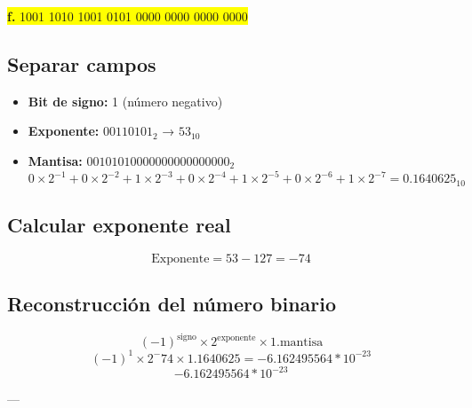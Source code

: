 \documentclass[a4paper,12pt]{article}
\begin{document}
	\newpage
	\begin{center}
		\colorbox{yellow}{\textbf{f.} 1001 1010 1001 0101 0000 0000 0000 0000}
		
		\subsection*{Separar campos}
		
		\begin{itemize}
			\item \textbf{Bit de signo:} 1 (número negativo)
			\item \textbf{Exponente:} $00110101_2$ → $53_{10}$
			\item \textbf{Mantisa:} $00101010000000000000000_2$ 
			\[
			0\times2^{-1} + 0\times2^{-2} + 1\times2^{-3} + 0\times2^{-4} + 1\times2^{-5} + 0\times2^{-6} + 1\times2^{-7} = 0.1640625_{10}
			\]
		\end{itemize}
		
		\subsection*{Calcular exponente real}
		
		\[
		\text{Exponente} = 53 - 127 = -74
		\]
		
		
		
		\subsection*{Reconstrucción del número binario}	
		\[
		(-1)^{\text{signo}} \times 2^{\text{exponente}} \times 1.\text{mantisa}
		\]
		\[
		(-1)^1 \times 2^-74 \times 1.1640625 = -6.162495564*10^{-23}
		\]
		\vspace{1em}
		\[
		\boxed{-6.162495564*10^{-23}}
		\]
		
		---
	\end{center}
\end{document}
